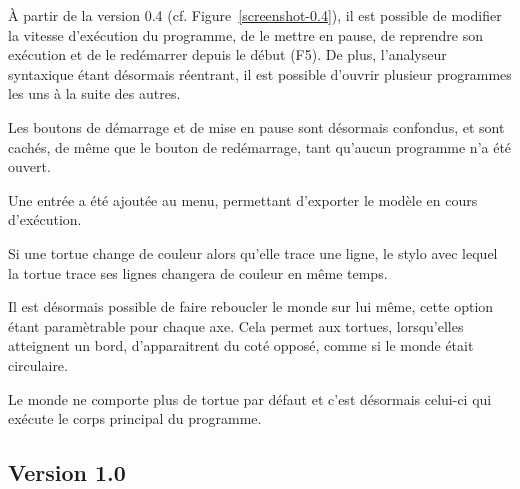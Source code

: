 À partir de la version 0.4 (cf. Figure~\ref{screenshot-0.4}), il est possible de modifier la vitesse d'exécution du programme, de le mettre en pause, de reprendre son exécution et de le redémarrer depuis le début (F5). De plus, l'analyseur syntaxique étant désormais réentrant, il est possible d'ouvrir plusieur programmes les uns à la suite des autres.

Les boutons de démarrage et de mise en pause sont désormais confondus, et sont cachés, de même que le bouton de redémarrage, tant qu'aucun programme n'a été ouvert.

Une entrée a été ajoutée au menu, permettant d'exporter le modèle en cours d'exécution.

Si une tortue change de couleur alors qu'elle trace une ligne, le stylo avec lequel la tortue trace ses lignes changera de couleur en même temps.

Il est désormais possible de faire reboucler le monde sur lui même, cette option étant paramètrable pour chaque axe. Cela permet aux tortues, lorsqu'elles atteignent un bord, d'apparaitrent du coté opposé, comme si le monde était circulaire.

Le monde ne comporte plus de tortue par défaut et c'est désormais celui-ci qui exécute le corps principal du programme.

\subsection{Version 1.0}

